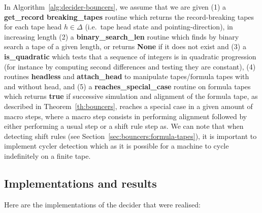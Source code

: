 \begin{remark}
    In Algorithm~\ref{alg:decider-bouncers}, we assume that we are given (1) a \textbf{get\_record breaking\_tapes} routine which returns the record-breaking tapes for each tape head $h\in\Delta$ (i.e.\ tape head state and pointing-direction), in increasing length (2) a \textbf{binary\_search\_len} routine which finds by binary search a tape of a given length, or returns \textbf{None} if it does not exist and (3) a \textbf{is\_quadratic} which tests that a sequence of integers is in quadratic progression (for instance by computing second differences and testing they are constant), (4) routines \textbf{headless} and \textbf{attach\_head} to manipulate tapes/formula tapes with and without head, and (5) a \textbf{reaches\_special\_case} routine on formula tapes which returns \textbf{true} if successive simulation and alignment of the formula tape, as described in Theorem~\ref{th:bouncers}, reaches a special case in a given amount of macro steps, where a macro step consists in performing alignment followed by either performing a usual step or a shift rule step as. We can note that when detecting shift rules (see Section~\ref{sec:bouncers:formula-tapes}), it is important to implement cycler detection which as it is possible for a machine to cycle indefinitely on a finite tape.
\end{remark}






\subsection{Implementations and results}\label{sec:bouncers-implem}


Here are the implementations of the decider that were realised:

